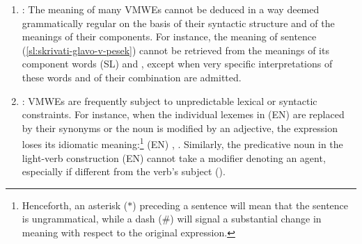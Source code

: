 \documentclass[output=paper,
modfonts,
]{langscibook}
\begin{document}
\begin{enumerate}
\item\label{prop:noncomp} : 
The meaning of many VMWEs cannot be deduced in a way deemed grammatically regular on the basis of their syntactic structure and of the meanings of their components. For instance, the meaning of sentence (\ref{sl:skrivati-glavo-v-pesek}) cannot be retrieved from the meanings of its component words (SL)  and , except when very specific interpretations of these words and of their combination are admitted.
\item\label{prop:constraints} : VMWEs are frequently subject to unpredictable lexical or syntactic constraints. For instance, when the individual lexemes in (EN)  are replaced by their synonyms or the noun is modified by an adjective, the expression loses its idiomatic meaning:\footnote{Henceforth, an asterisk ($\ast$) preceding a sentence will mean that the sentence is ungrammatical, while a dash (\#) will signal a substantial change in meaning with respect to the original expression.}  (EN) , . Similarly, the predicative noun in the light-verb construction (EN)  cannot take a modifier denoting an agent, especially if different from the verb's subject ().



\end{enumerate}
\end{document}
